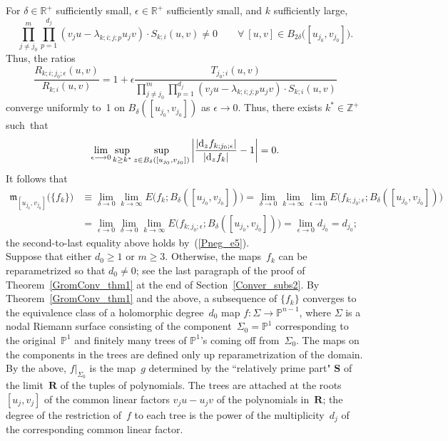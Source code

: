 \documentclass[11pt]{article}
\numberwithin{equation}{section}
\theoremstyle{definition}
\def\eref#1{(\ref{#1})}
\def\lra{\longrightarrow}
\def\fm{\mathfrak m}
\def\P{\mathbb{P}}
\def\R{\mathbb R}
\def\bR{\mathbf R}
\def\bS{\mathbf S}
\def\Z{{\mathbb Z}}
\def\de{\delta}
\def\ep{\epsilon}
\def\la{\lambda}
\def\Si{\Sigma}
\def\i{\infty}
\def\nd{\textnormal{d}}
\begin{document}
\noindent
For $\de\!\in\!\R^+$ sufficiently small, 
$\ep\!\in\!\R^+$ sufficiently small, and $k$ sufficiently large,
$$\prod_{j\neq j_0}^m\prod\limits_{p=1}^{d_j}(v_ju\!-\!\la_{k;i;j;p}u_jv) 
\cdot S_{k;i}(u,v)\neq0 \qquad\forall~[u,v]\!\in\!B_{2\de}\big([u_{j_0},v_{j_0}]\big).$$
Thus, the ratios
$$\frac{R_{k;i;j_0;\ep}(u,v)}{R_{k;i}(u,v)}
=1+\ep\frac{T_{j_0;i}(u,v)}
{\prod\limits_{j\neq j_0}^m\prod\limits_{p=1}^{d_j}(v_ju\!-\!\la_{k;i;j;p}u_jv) 
\cdot S_{k;i}(u,v)}$$
converge uniformly to~1 on $B_{\de}([u_{j_0},v_{j_0}])$ as $\ep\!\lra\!0$.
Thus, there exists $k^*\!\in\!\Z^+$ such~that 
$$\lim_{\ep\lra0}\sup_{k\ge k^*}\sup_{z\in B_{\de}([u_{j_0},v_{j_0}])}
\bigg|\frac{|\nd_zf_{k;j_0;\ep}|}{|\nd_zf_k|}-1\bigg|=0.$$
It follows that
\begin{equation*}\begin{split}
\fm_{[u_{j_0},v_{j_0}]}\big(\{f_k\}\big)
&\equiv \lim_{\de\lra0}\lim_{k\lra\i}E\big(f_k;B_{\de}([u_{j_0},v_{j_0}])\big)
= \lim_{\de\lra0}\lim_{k\lra\i}\lim_{\ep\lra0}E\big(f_{k;j_0;\ep};B_{\de}([u_{j_0},v_{j_0}])\big)\\ 
&=\lim_{\ep\lra0}\lim_{\de\lra0}\lim_{k\lra\i}\!
E\big(f_{k;j_0;\ep};B_{\de}([u_{j_0},v_{j_0}])\big)
=\lim_{\ep\lra0}d_{j_0}=d_{j_0};
\end{split}\end{equation*}
the second-to-last equality above holds by~\eref{Pneg_e5}.\\

\noindent
Suppose that either $d_0\!\ge\!1$ or $m\!\ge\!3$.
Otherwise, the maps~$f_k$ can be reparametrized so that $d_0\!\neq\!0$;
see the last paragraph of the proof of Theorem~\ref{GromConv_thm1}
at the end of Section~\ref{Conver_subs2}.
By Theorem~\ref{GromConv_thm1} and the above, a subsequence of $\{f_k\}$ converges
to the equivalence class of a holomorphic degree~$d_0$ map $f\!:\Si\!\lra\!\P^{n-1}$,
where $\Si$ is a nodal Riemann surface consisting of the component~$\Si_0\!=\!\P^1$
corresponding to the original~$\P^1$ and finitely many trees of $\P^1$'s coming off 
from~$\Si_0$.
The maps on the components in the trees are defined only up reparametrization of
the domain.
By the above, $f|_{\Si_0}$ is the map~$g$ determined by the ``relatively prime part"
$\bS$ of the limit~$\bR$ of the tuples of polynomials.
The trees are attached at the roots~$[u_j,v_j]$ of the common linear factors 
$v_ju\!-\!u_jv$ of  the polynomials in~$\bR$;
the degree of the restriction of~$f$ to each tree is the power 
of the multiplicity~$d_j$ of the corresponding common linear factor.\\
\end{document}
